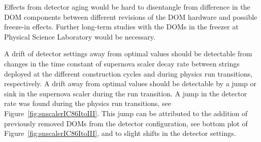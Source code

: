 

Effects from detector aging would be hard to disentangle from difference in the DOM components between different revisions of the DOM hardware and possible freeze-in effects. Further long-term studies with the DOMs in the freezer at Physical Science Laboratory would be necessary.

A drift of detector settings away from optimal values should be detectable from changes in the time constant of supernova scaler decay rate between strings deployed at the different construction cycles and during physics run transitions, respectively. A drift away from optimal values should be detectable by a jump or sink in the supernova scaler during the run transition. A jump in the detector rate was found during the physics run transitions, see Figure~\ref{fig:snscalerIC86ItoIII}. This jump can be attributed to the addition of previously removed DOMs from the detector configuration, see bottom plot of Figure~\ref{fig:snscalerIC86ItoIII}, and to slight shifts in the detector settings.


